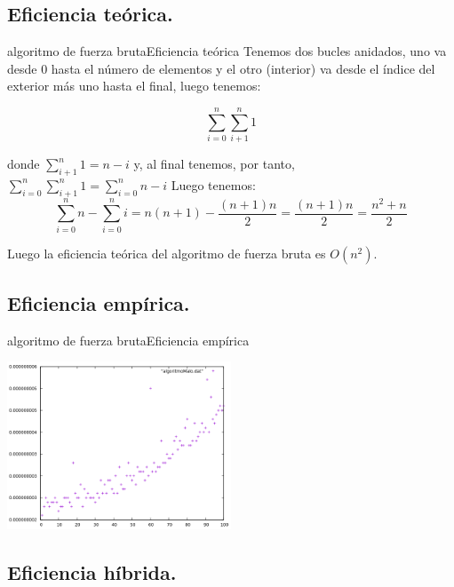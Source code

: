\documentclass{beamer}
\begin{document}
\subsection{Eficiencia teórica.}

\begin{frame}{algoritmo de fuerza bruta}{Eficiencia teórica}
Tenemos dos bucles anidados, uno va desde 0 hasta el número de elementos y el otro (interior) va desde el índice del exterior más uno hasta el final, luego tenemos:

$$\sum_{i=0}^{n}\sum_{i+1}^{n}1$$

donde $\sum_{i+1}^{n}1=n-i$ y, al final tenemos, por tanto, $\sum_{i=0}^{n}\sum_{i+1}^{n}1 = \sum_{i=0}^{n}n-i$
Luego tenemos:
$$\sum_{i=0}^{n}n - \sum_{i=0}^{n}i  = n(n+1)-\frac{(n+1)n}{2}= \frac{(n+1)n}{2}=\frac{n^2+n}{2}$$

Luego la eficiencia teórica del algoritmo de fuerza bruta es $O(n^2)$.
\end{frame}
\subsection{Eficiencia empírica.}

\begin{frame}{algoritmo de fuerza bruta}{Eficiencia empírica}

	\includegraphics[width=0.5\textwidth]{algoritmoMalo.png}
\end{frame}
\subsection{Eficiencia híbrida.}
\end{document}
